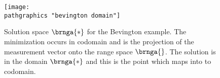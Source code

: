 \begin{figure}[t]
	\texttt{[image: \\pathgraphics "bevington domain"]}
	\caption[Solution space for Bevington example]{Solution space $\brnga{*}$ for the Bevington example. The minimization occurs in codomain and is the projection of the measurement vector onto the range space $\brnga{}$. The solution is in the domain $\brnga{*}$ and this is the point which maps into to codomain.}
	\label{fig:bevington domain}
\end{figure}

\endinput  %

